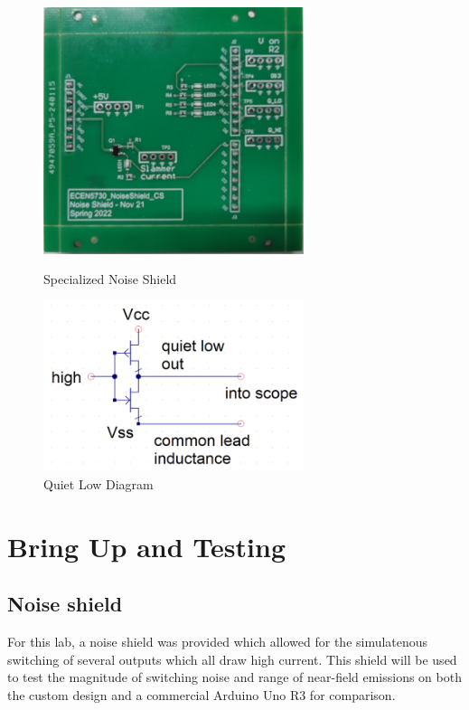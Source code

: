 \documentclass{article}
\begin{document}
\begin{figure}
    \vspace*{-2.0cm}
    \includegraphics[width=3in]{shield.png}
    \caption{Specialized Noise Shield}

    \vspace*{0.5cm}
    \includegraphics[width=3in]{quiet.png}
    \caption{Quiet Low Diagram}
    \vspace*{-1.5cm}
\end{figure}

\section{Bring Up and Testing}
\subsection{Noise shield}
For this lab, a noise shield was provided which allowed for the simulatenous switching of several outputs which all draw high current.
This shield will be used to test the magnitude of switching noise and range of near-field emissions on both the custom design and a commercial Arduino Uno R3 for comparison.

\end{document}
